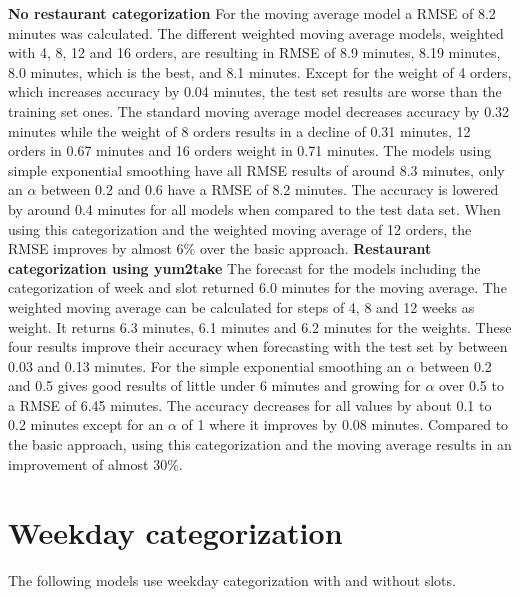 \newline\newline\textbf{No restaurant categorization}\newline
For the moving average model a RMSE of 8.2 minutes was calculated. The different weighted moving average models, weighted with 4, 8, 12 and 16 orders, are resulting in RMSE of 8.9 minutes, 8.19 minutes, 8.0 minutes, which is the best, and 8.1 minutes. Except for the weight of 4 orders, which increases accuracy by 0.04 minutes, the test set results are worse than the training set ones. The standard moving average model decreases accuracy by 0.32 minutes while the weight of 8 orders results in a decline of 0.31 minutes, 12 orders in 0.67 minutes and 16 orders weight in 0.71 minutes. The models using simple exponential smoothing have all RMSE results of around 8.3 minutes, only an $\alpha$ between 0.2 and 0.6 have a RMSE of 8.2 minutes. The accuracy is lowered by around 0.4 minutes for all models when compared to the test data set.\newline
When using this categorization and the weighted moving average of 12 orders, the RMSE improves by almost 6\% over the basic approach.
\newline\newline\textbf{Restaurant categorization using yum2take}\newline
The forecast for the models including the categorization of week and slot returned 6.0 minutes for the moving average. The weighted moving average can be calculated for steps of 4, 8 and 12 weeks as weight. It returns 6.3 minutes, 6.1 minutes and 6.2 minutes for the weights. These four results improve their accuracy when forecasting with the test set by between 0.03 and 0.13 minutes. For the simple exponential smoothing an $\alpha$ between 0.2 and 0.5 gives good results of little under 6 minutes and growing for $\alpha$ over 0.5 to a RMSE of 6.45 minutes. The accuracy decreases for all values by about 0.1 to 0.2 minutes except for an $\alpha$ of 1 where it improves by 0.08 minutes.\newline
Compared to the basic approach, using this categorization and the moving average results in an improvement of almost 30\%.
\section{Weekday categorization}\label{section:Weekday categorization}
The following models use weekday categorization with and without slots.
